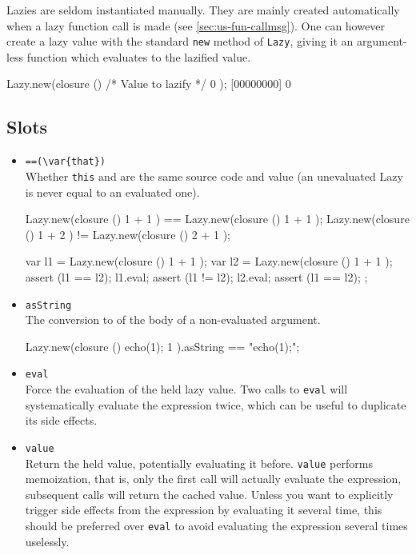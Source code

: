 Lazies are seldom instantiated manually. They are mainly created
automatically when a lazy function call is made (see
\autoref{sec:us-fun-callmsg}). One can however create a lazy value with the
standard \lstinline|new| method of \lstinline|Lazy|, giving it an
argument-less function which evaluates to the lazified value.

\begin{urbiscript}[firstnumber=last]
Lazy.new(closure () { /* Value to lazify */ 0 });
[00000000] 0
\end{urbiscript}

\subsection{Slots}

\begin{itemize}
\item \lstinline|==(\var{that})|\\
  Whether \lstinline|this| and  are the same source code and
  value (an unevaluated Lazy is never equal to an evaluated one).
\begin{urbiassert}[firstnumber=last]
Lazy.new(closure () { 1 + 1 }) == Lazy.new(closure () { 1 + 1 });
Lazy.new(closure () { 1 + 2 }) != Lazy.new(closure () { 2 + 1 });
\end{urbiassert}
\begin{urbiscript}[firstnumber=last]
{
  var l1 = Lazy.new(closure () { 1 + 1 });
  var l2 = Lazy.new(closure () { 1 + 1 });
  assert (l1 == l2);
  l1.eval;
  assert (l1 != l2);
  l2.eval;
  assert (l1 == l2);
};
\end{urbiscript}

\item \lstinline|asString|\\
  The conversion to  of the body of a non-evaluated
  argument.
\begin{urbiassert}[firstnumber=last]
Lazy.new(closure () { echo(1); 1 }).asString == "echo(1);";
\end{urbiassert}

\item \lstinline|eval|\\
  Force the evaluation of the held lazy value. Two calls to
  \lstinline|eval| will systematically evaluate the expression twice,
  which can be useful to duplicate its side effects.

\item \lstinline|value|\\
  Return the held value, potentially evaluating it
  before. \lstinline|value| performs memoization, that is, only the
  first call will actually evaluate the expression, subsequent calls
  will return the cached value. Unless you want to explicitly trigger
  side effects from the expression by evaluating it several time, this
  should be preferred over \lstinline|eval| to avoid evaluating the
  expression several times uselessly.
\end{itemize}


